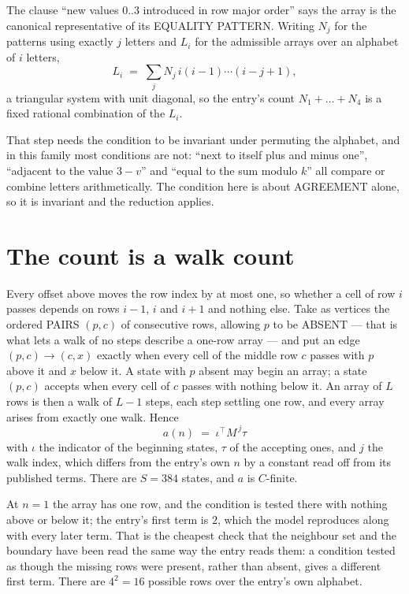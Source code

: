 \documentclass[11pt,a4paper]{article}
\theoremstyle{plain}
\theoremstyle{definition}
\begin{document}
The clause ``new values $0..3$ introduced in row major order'' says the array is the
canonical representative of its EQUALITY PATTERN. Writing $N_j$ for the patterns using exactly
$j$ letters and $L_i$ for the admissible arrays over an alphabet of $i$ letters,
\[
L_i\;=\;\sum_j N_j\,i(i-1)\cdots(i-j+1),
\]
a triangular system with unit diagonal, so the entry's count $N_1+\dots+N_{4}$ is a
fixed rational combination of the $L_i$.

That step needs the condition to be invariant under permuting the alphabet, and in this family
most conditions are not: ``next to itself plus and minus one'', ``adjacent to the value
$3-v$'' and ``equal to the sum modulo $k$'' all compare or combine letters arithmetically.
The condition here is about AGREEMENT alone, so it is invariant and the reduction applies.

\section{The count is a walk count}

Every offset above moves the row index by at most one, so whether a cell of row $i$ passes
depends on rows $i-1$, $i$ and $i+1$ and nothing else. Take as vertices the ordered PAIRS
$(p,c)$ of consecutive rows, allowing $p$ to be ABSENT --- that is what lets a walk of no steps
describe a one-row array --- and put an edge $(p,c)\to(c,x)$ exactly when every cell of the
middle row $c$ passes with $p$ above it and $x$ below it. A state with $p$ absent may begin an
array; a state $(p,c)$ accepts when every cell of $c$ passes with nothing below it. An array of
$L$ rows is then a walk of $L-1$ steps, each step settling one row, and every array arises from
exactly one walk. Hence
\[
a(n)\;=\;\iota^{\!\top}M^{\,j}\tau
\]
with $\iota$ the indicator of the beginning states, $\tau$ of the accepting ones, and $j$ the
walk index, which differs from the entry's own $n$ by a constant read off from its published
terms. There are $S=384$ states, and $a$ is $C$-finite.

At $n=1$ the array has one row, and
the condition is tested there with nothing above or below it; the entry's first term is
$2$, which the model reproduces along with every later term. That is the cheapest check
that the neighbour set and the boundary have been read the same way the entry reads them: a
condition tested as though the missing rows were present, rather than absent, gives a different
first term. There are $4^{2}=16$ possible rows over the entry's own alphabet.
\end{document}
